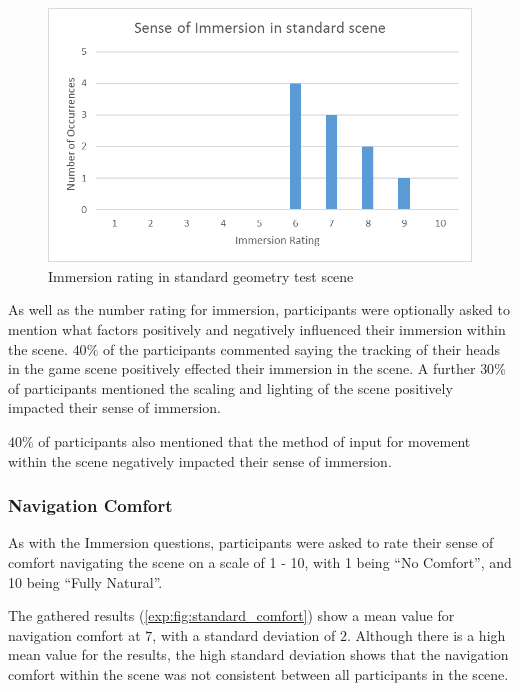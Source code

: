 				\begin{figure}[h]
					\includegraphics[width=1\textwidth]{Images/Standard_Immersion}
					\centering
					\caption{Immersion rating in standard geometry test scene}
					\label{exp:fig:standard_immersion}
				\end{figure}

				As well as the number rating for immersion, participants were optionally asked to mention what factors positively and negatively influenced their immersion within the scene.
				$40\%$ of the participants commented saying the tracking of their heads in the game scene positively effected their immersion in the scene.
				A further $30\%$ of participants mentioned the scaling and lighting of the scene positively impacted their sense of immersion.

				$40\%$ of participants also mentioned that the method of input for movement within the scene negatively impacted their sense of immersion.

			\subsubsection{Navigation Comfort}

				As with the Immersion questions, participants were asked to rate their sense of comfort navigating the scene on a scale of 1 - 10, with 1 being \enquote{No Comfort}, and 10 being \enquote{Fully Natural}.

				The gathered results (\autoref{exp:fig:standard_comfort}) show a mean value for navigation comfort at $7$, with a standard deviation of $2$.
				Although there is a high mean value for the results, the high standard deviation shows that the navigation comfort within the scene was not consistent between all participants in the scene.

